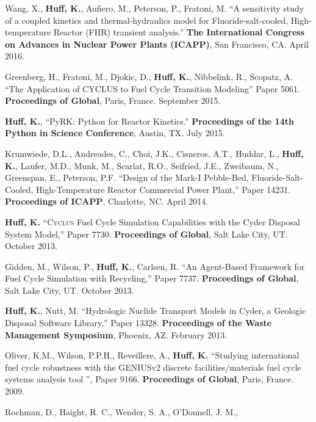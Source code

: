 \documentclass[margin,line]{resume}
\newcommand{\Cyclus}{\textsc{Cyclus}\xspace}%
\begin{document}
\begin{resume}
\begin{bibenum}
      \item Wang, X., \textbf{Huff, K.}, Aufiero, M., Peterson, P., Fratoni, M.
            ``A sensitivity study of a coupled kinetics and thermal-hydraulics 
            model for Fluoride-salt-cooled, High-temperature Reactor (FHR) 
            transient analysis.'' \textbf{The International 
            Congress on Advances in Nuclear Power Plants (ICAPP)}, San 
            Francisco, CA. April 2016.
      \item Greenberg, H., Fratoni, M., Djokic, D., \textbf{Huff, K.},
         Nibbelink, R., Scopatz, A. ``The Application of CYCLUS to Fuel Cycle
         Transition Modeling'' Paper 5061.
         \textbf{Proceedings of Global}, Paris, France. September 2015.
      \item \textbf{Huff, K.}, ``PyRK: Python for Reactor Kinetics.''
         \textbf{Proceedings of the 14th Python in Science Conference}, Austin,
         TX. July 2015.
      \item Krumwiede, D.L., Andreades, C., Choi, J.K., Cisneros, A.T., Huddar, L.,
         \textbf{Huff, K.}, Laufer, M.D., Munk, M., Scarlat, R.O., Seifried, J.E.,
         Zweibaum, N., Greenspan, E., Peterson, P.F.  ``Design of the Mark-I
         Pebble-Bed, Fluoride-Salt-Cooled, High-Temperature Reactor Commercial Power
         Plant,'' Paper 14231.  \textbf{Proceedings of ICAPP}, Charlotte, NC. April 2014.
      \item \textbf{Huff, K.} ``\Cyclus Fuel Cycle Simulation Capabilities with the Cyder Disposal System Model,'' Paper 7730.
         \textbf{Proceedings of Global}, Salt Lake City, UT. October 2013.
      \item Gidden, M., Wilson, P., \textbf{Huff, K.}, Carlsen, R. ``An Agent-Based Framework for Fuel Cycle Simulation with Recycling,'' Paper 7737.
         \textbf{Proceedings of Global}, Salt Lake City, UT. October 2013.
      \item \textbf{Huff, K.}, Nutt, M. ``Hydrologic Nuclide Transport Models in Cyder, a Geologic Disposal Software Library,'' Paper 13328.
         \textbf{Proceedings of the Waste Management Symposium}, Phoenix, AZ.  February 2013.
      \item Oliver, K.M., Wilson, P.P.H., Reveillere, A., \textbf{Huff, K.} ``Studying international fuel cycle robustness with the GENIUSv2 discrete
          facilities/materials fuel cycle systems analysis tool	'', Paper 9166.
          \textbf{Proceedings of Global}, Paris, France. 2009.
      \item Rochman, D., Haight, R. C., Wender, S. A., O'Donnell, J. M.,

\end{bibenum}
\end{resume}
\end{document}
